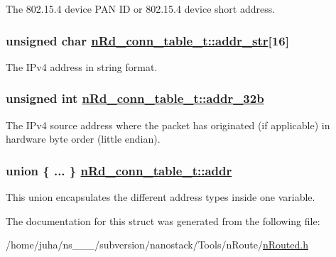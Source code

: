The 802.15.4 device PAN ID or 802.15.4 device short address. \hypertarget{structnRd__conn__table__t_581a82e1027a1ab6f1c4f81afdc5168b}{
\subsubsection[addr\_\-str]{\setlength{\rightskip}{0pt plus 5cm}unsigned char \hyperlink{structnRd__conn__table__t_581a82e1027a1ab6f1c4f81afdc5168b}{n\-Rd\_\-conn\_\-table\_\-t::addr\_\-str}\mbox{[}16\mbox{]}}}
\label{structnRd__conn__table__t_581a82e1027a1ab6f1c4f81afdc5168b}


The IPv4 address in string format. \hypertarget{structnRd__conn__table__t_ca2bf21d951dd2a9a5f7ae3cfe76c663}{
\subsubsection[addr\_\-32b]{\setlength{\rightskip}{0pt plus 5cm}unsigned int \hyperlink{structnRd__conn__table__t_ca2bf21d951dd2a9a5f7ae3cfe76c663}{n\-Rd\_\-conn\_\-table\_\-t::addr\_\-32b}}}
\label{structnRd__conn__table__t_ca2bf21d951dd2a9a5f7ae3cfe76c663}


The IPv4 source address where the packet has originated (if applicable) in hardware byte order (little endian). \hypertarget{structnRd__conn__table__t_d7e8f221fee270280ec02008d48aec4d}{
\subsubsection[addr]{\setlength{\rightskip}{0pt plus 5cm}union \{ ... \}   \hyperlink{structnRd__conn__table__t_d7e8f221fee270280ec02008d48aec4d}{n\-Rd\_\-conn\_\-table\_\-t::addr}}}
\label{structnRd__conn__table__t_d7e8f221fee270280ec02008d48aec4d}


This union encapsulates the different address types inside one variable. 

The documentation for this struct was generated from the following file:\begin{CompactItemize}
\item 
/home/juha/ns\_\_\_/subversion/nanostack/Tools/n\-Route/\hyperlink{nRouted_8h}{n\-Routed.h}\end{CompactItemize}
